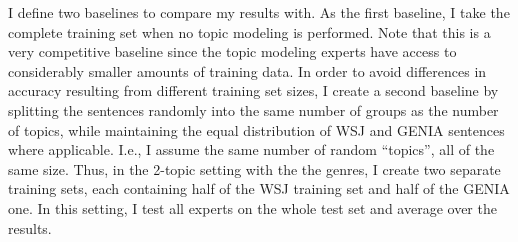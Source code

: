I define two baselines to compare my results with. As the first baseline, I take the complete training set when no topic modeling is performed. Note that this is a very competitive baseline since the topic modeling experts have access to considerably smaller amounts of training data.  In order to avoid differences in accuracy resulting from different training set sizes, I create a second baseline by splitting the sentences randomly into the same number of groups as the number of topics, while maintaining the equal distribution of WSJ and GENIA sentences where applicable. I.e., I assume the same number of random ``topics'', all of the same size. Thus, in the 2-topic setting with the the genres, I create two separate training sets, each containing half of the WSJ training set and half of the GENIA one. In this setting, I test all experts on the whole test set and average over the results.



